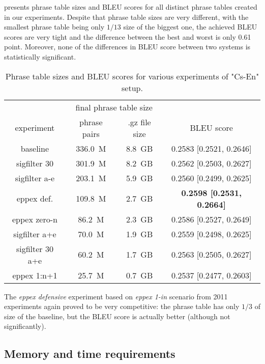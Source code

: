  presents phrase table sizes and BLEU scores for all
distinct phrase tables created in our experiments.
Despite that phrase table sizes are very different, with the smallest phrase table being only
$1/13$ size of the biggest one, the achieved BLEU scores are very tight and the difference
between the best and worst is only 0.61 point.
Moreover, none of the differences in BLEU score between two systems is statistically
significant. %

\begin{table}[ht]
\centering
\begin{tabular}{ | c | c c | c | }
\hline
 & \multicolumn{2}{|c|}{final phrase table size} & \\
experiment & phrase pairs & .gz file size & BLEU score \\
\hline
\hline
baseline          & 336.0~M & 8.8~GB & 0.2583 [0.2521, 0.2646] \\
sigfilter 30      & 301.9~M & 8.2~GB & 0.2562 [0.2503, 0.2627] \\
sigfilter a-e     & 203.1~M & 5.9~GB & 0.2560 [0.2499, 0.2625] \\
eppex def.        & 109.8~M & 2.7~GB & \textbf{0.2598 [0.2531, 0.2664]} \\
eppex zero-n      &  86.2~M & 2.3~GB & 0.2586 [0.2527, 0.2649] \\
sigfilter a+e     &  70.0~M & 1.9~GB & 0.2559 [0.2498, 0.2625] \\
sigfilter 30 a+e  &  60.2~M & 1.7~GB & 0.2563 [0.2505, 0.2627] \\
eppex 1:n+1       &  25.7~M & 0.7~GB & 0.2537 [0.2477, 0.2603] \\
\hline
\end{tabular}
\caption{\label{cs-en-wmt13-pt-size-and-bleu}
Phrase table sizes and BLEU scores for various experiments of "Cs-En" setup.}
\end{table}

The \emph{eppex defensive} experiment based on \emph{eppex 1-in} scenario from 2011 experiments
again proved to be very competitive: the phrase table has only $1/3$ of size of the baseline,
but the BLEU score is actually better (although not significantly).

\subsection{Memory and time requirements}

